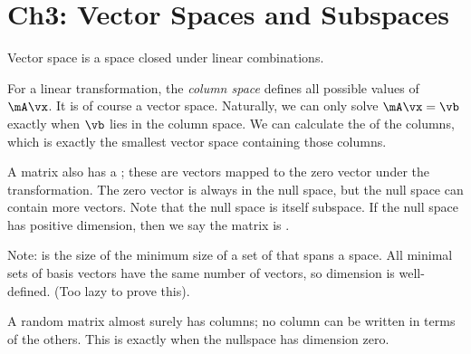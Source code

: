 \section{Ch3: Vector Spaces and Subspaces}

Vector space is a space closed under linear combinations.

For a linear transformation, the \emph{column space} defines all
possible values of $\mA\vx$. It is of course a vector space. Naturally,
we can only solve $\mA\vx=\vb$ exactly when $\vb$ lies in the column
space. We can calculate the  of the columns, which is
exactly the smallest vector space containing those columns.

A matrix also has a ; these are vectors mapped to the
zero vector under the transformation. The zero vector is always in the
null space, but the null space can contain more vectors. Note that the
null space is itself subspace. If the null space has positive dimension,
then we say the matrix is .

Note:  is the size of the minimum size of a set of
 that spans a space. All minimal sets of basis
vectors have the same number of vectors, so dimension is well-defined.
(Too lazy to prove this).

A random matrix almost surely has  columns; no
column can be written in terms of the others. This is exactly when the
nullspace has dimension zero.
